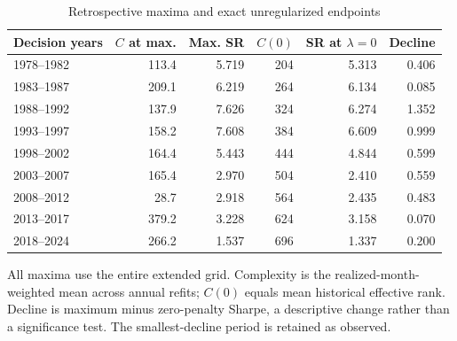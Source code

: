 \begin{table}[H]\centering\small\setlength{\tabcolsep}{5pt}
\caption{Retrospective maxima and exact unregularized endpoints}\label{tab:historical_endpoints}
\begin{tabular}{@{}lrrrrr@{}}\toprule
Decision years & $C$ at max. & Max. SR & $C(0)$ & SR at $\lambda=0$ & Decline \\ \midrule
1978--1982 & 113.4 & 5.719 & 204 & 5.313 & 0.406 \\
1983--1987 & 209.1 & 6.219 & 264 & 6.134 & 0.085 \\
1988--1992 & 137.9 & 7.626 & 324 & 6.274 & 1.352 \\
1993--1997 & 158.2 & 7.608 & 384 & 6.609 & 0.999 \\
1998--2002 & 164.4 & 5.443 & 444 & 4.844 & 0.599 \\
2003--2007 & 165.4 & 2.970 & 504 & 2.410 & 0.559 \\
2008--2012 & 28.7 & 2.918 & 564 & 2.435 & 0.483 \\
2013--2017 & 379.2 & 3.228 & 624 & 3.158 & 0.070 \\
2018--2024 & 266.2 & 1.537 & 696 & 1.337 & 0.200 \\
\bottomrule\end{tabular}\par\vspace{5pt}
\begin{minipage}{\textwidth}\footnotesize All maxima use the entire extended grid. Complexity is the realized-month-weighted mean across annual refits; $C(0)$ equals mean historical effective rank. Decline is maximum minus zero-penalty Sharpe, a descriptive change rather than a significance test. The smallest-decline period is retained as observed.\end{minipage}\end{table}
